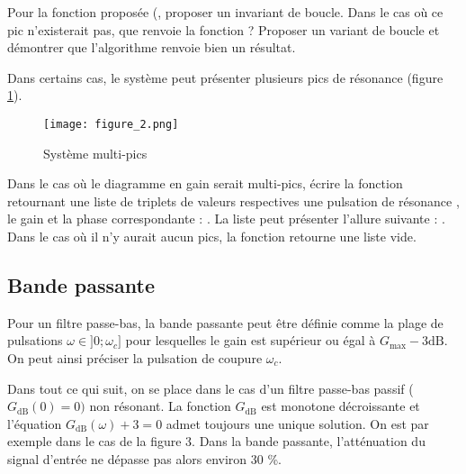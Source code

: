 \begin{dBox}

\end{dBox}

\begin{tBox}
\question{} Pour la fonction proposée (, proposer un invariant de boucle. Dans le cas où ce pic n'existerait pas, que renvoie la fonction ? Proposer un variant de boucle et démontrer que l'algorithme renvoie bien un résultat.
\end{tBox}



Dans certains cas, le système peut présenter plusieurs pics de résonance (figure \ref{Fig2}).

\begin{figure}[!h]
\begin{center}
\texttt{[image: figure\_2.png]} 
\caption{\label{Fig2} Système multi-pics}
\end{center}
\end{figure}

\begin{tBox}
\question{} Dans le cas où le diagramme en gain serait multi-pics, écrire la fonction \\  retournant une liste  de triplets de valeurs respectives une pulsation de résonance , le gain  et la phase correspondante  : . La liste  peut présenter l'allure suivante : . Dans le cas où il n'y aurait aucun pics, la fonction retourne une liste vide.
\end{tBox}


\subsection{Bande passante}

\begin{dBox}
Pour un filtre passe-bas, la bande passante peut être définie comme la plage de pulsations $\omega \in ]0;\omega_c]$ pour lesquelles le gain est supérieur ou égal à $G_{\text{max}}-3 \text{dB}$. On peut ainsi préciser la pulsation de coupure $\omega_c$.
\end{dBox}



Dans tout ce qui suit, on se place dans le cas d'un filtre passe-bas passif ($G_{\text{dB}}(0) = 0)$ non résonant. La fonction $G_{\text{dB}}$ est monotone décroissante et l'équation $G_\text{dB}(\omega) + 3 = 0$ admet toujours une unique solution. On est par exemple dans le cas de la figure 3. Dans la bande passante, l'atténuation du signal d'entrée ne dépasse pas alors environ 30 \%.

